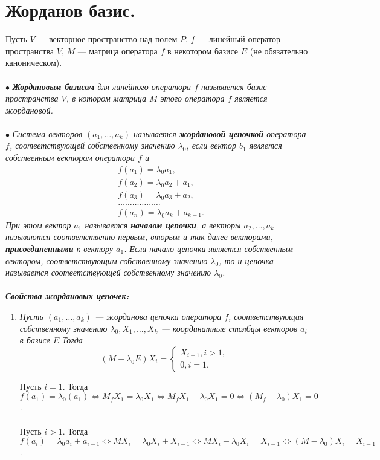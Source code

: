 





\section{Жорданов базис.}
Пусть $V$ --- векторное пространство над полем $P$, $f$ --- линейный оператор пространства $V$, $M$ --- матрица оператора $f$ в некотором базисе $E$ (не обязательно каноническом).\\\\
$\bullet$ \textit{\textbf{Жордановым базисом} для линейного оператора $f$ называется базис пространства $V$, в котором матрица $M$ этого оператора $f$ является жордановой.}\\\\
$\bullet$ \textit{Система векторов $(a_1, \dots, a_k)$ называется \textbf{жордановой цепочкой} оператора $f$, соответствующей собственному значению $\lambda_0$, если вектор $b_1$ является собственным вектором оператора $f$ и}\begin{align*}
	&f(a_1) = \lambda_0 a_1,\\
	&f(a_2) = \lambda_0 a_2 + a_1,\\
	&f(a_3) = \lambda_0 a_3 + a_2,\\
	&\dots\dots\dots\dots\dots\dots\\
	&f(a_n) = \lambda_0 a_k + a_{k-1}.
\end{align*}
\textit{При этом вектор $a_1$ называется \textbf{началом цепочки}, а векторы $a_2,\dots,a_k$ называются соответственно первым, вторым и так далее векторами, \textbf{присоединенными} к вектору $a_1$. Если начало цепочки является собственным вектором, соответствующим собственному значению $\lambda_0$, то и цепочка называется соответствующей собственному значению $\lambda_0$.}\\\\
\textit{\textbf{Свойства жордановых цепочек:}}
\begin{enumerate}
	\item \textit{Пусть $(a_1, \dots, a_k)$ --- жорданова цепочка оператора $f$, соответствующая собственному значению $\lambda_0, X_1,\dots,X_k$ --- координатные столбцы векторов $a_i$ в базисе $E$ Тогда}
	$$(M - \lambda_0 E) X_i = \begin{cases}X_{i-1}, i>1,\\0, i = 1. \end{cases}$$
	\begin{Proof}
		Пусть $ i = 1$. Тогда $f(a_1) = \lambda_0 (a_1) \Longleftrightarrow M_f X_1 = \lambda_0 X_1 \Longleftrightarrow M_f X_1 - \lambda_0 X_1 = 0 \Longleftrightarrow (M_f -  \lambda_0) X_1 = 0$. \\\\
		Пусть $ i > 1$. Тогда $f(a_i) = \lambda_0 a_i + a_{i-1} \Longleftrightarrow M X_i = \lambda_0 X_i + X_{i-1} \Longleftrightarrow M X_i - \lambda_0 X_i = X_{i-1} \Longleftrightarrow (M - \lambda_0) X_i = X_{i-1}$.
	\end{Proof}
\end{enumerate}
